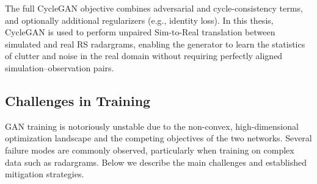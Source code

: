The full CycleGAN objective combines adversarial and cycle-consistency terms, and optionally additional regularizers (e.g., identity loss).
In this thesis, CycleGAN is used to perform unpaired Sim-to-Real translation between simulated and real RS radargrams, enabling the generator to learn the statistics of clutter and noise in the real domain without requiring perfectly aligned simulation–observation pairs.

\subsection{Challenges in Training}
\label{subsec:gan_challenges}
GAN training is notoriously unstable due to the non-convex, high-dimensional optimization landscape and the competing objectives of the two networks.
Several failure modes are commonly observed, particularly when training on complex data such as radargrams.
Below we describe the main challenges and established mitigation strategies.

